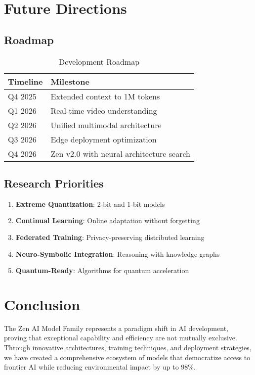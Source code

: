 \documentclass[11pt,a4paper]{article}
\begin{document}
\section{Future Directions}

\subsection{Roadmap}

\begin{table}[H]
\centering
\begin{tabular}{ll}
\toprule
\textbf{Timeline} & \textbf{Milestone} \\
\midrule
Q4 2025 & Extended context to 1M tokens \\
Q1 2026 & Real-time video understanding \\
Q2 2026 & Unified multimodal architecture \\
Q3 2026 & Edge deployment optimization \\
Q4 2026 & Zen v2.0 with neural architecture search \\
\bottomrule
\end{tabular}
\caption{Development Roadmap}
\end{table}

\subsection{Research Priorities}

\begin{enumerate}
    \item \textbf{Extreme Quantization}: 2-bit and 1-bit models
    \item \textbf{Continual Learning}: Online adaptation without forgetting
    \item \textbf{Federated Training}: Privacy-preserving distributed learning
    \item \textbf{Neuro-Symbolic Integration}: Reasoning with knowledge graphs
    \item \textbf{Quantum-Ready}: Algorithms for quantum acceleration
\end{enumerate}

\section{Conclusion}

The Zen AI Model Family represents a paradigm shift in AI development, proving that exceptional capability and 
efficiency are not mutually exclusive. Through innovative architectures, training techniques, and deployment 
strategies, we have created a comprehensive ecosystem of models that democratize access to frontier AI while 
reducing environmental impact by up to 98\%.
\end{document}
